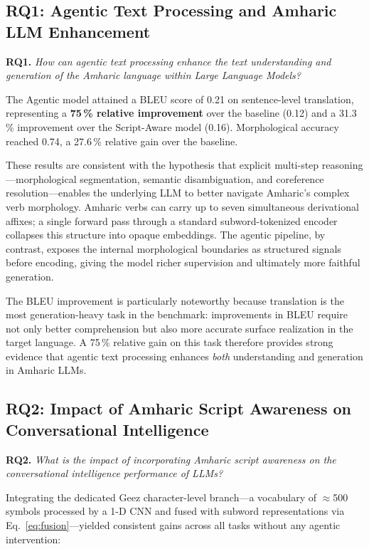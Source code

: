 \subsection{RQ1: Agentic Text Processing and Amharic LLM Enhancement}
\label{sec:rq1}

\textbf{RQ1.} \textit{How can agentic text processing enhance the text understanding and
generation of the Amharic language within Large Language Models?}

The Agentic model attained a BLEU score of 0.21 on sentence-level translation, representing a
\textbf{75\,\% relative improvement} over the baseline (0.12) and a 31.3\,\% improvement over
the Script-Aware model (0.16).  Morphological accuracy reached 0.74, a 27.6\,\% relative gain
over the baseline.

These results are consistent with the hypothesis that explicit multi-step reasoning---morphological
segmentation, semantic disambiguation, and coreference resolution---enables the underlying LLM
to better navigate Amharic's complex verb morphology.  Amharic verbs can carry up to seven
simultaneous derivational affixes; a single forward pass through a standard subword-tokenized
encoder collapses this structure into opaque embeddings.  The agentic pipeline, by contrast,
exposes the internal morphological boundaries as structured signals before encoding, giving the
model richer supervision and ultimately more faithful generation.

The BLEU improvement is particularly noteworthy because translation is the most generation-heavy
task in the benchmark: improvements in BLEU require not only better comprehension but also more
accurate surface realization in the target language.  A 75\,\% relative gain on this task
therefore provides strong evidence that agentic text processing enhances \emph{both} understanding
and generation in Amharic LLMs.

\subsection{RQ2: Impact of Amharic Script Awareness on Conversational Intelligence}
\label{sec:rq2}

\textbf{RQ2.} \textit{What is the impact of incorporating Amharic script awareness on the
conversational intelligence performance of LLMs?}

Integrating the dedicated Ge\textquotesingle ez character-level branch---a vocabulary of
$\approx$500 symbols processed by a 1-D CNN and fused with subword representations via
Eq.~\eqref{eq:fusion}---yielded consistent gains across all tasks without any agentic
intervention:


